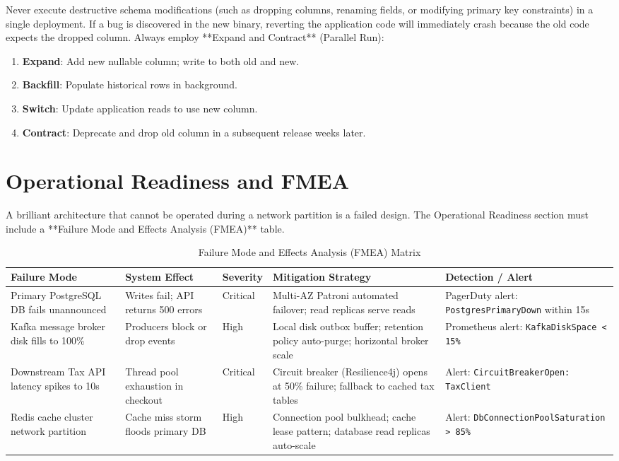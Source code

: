 \begin{productionwarningbox}
Never execute destructive schema modifications (such as dropping columns, renaming fields, or modifying primary key constraints) in a single deployment. If a bug is discovered in the new binary, reverting the application code will immediately crash because the old code expects the dropped column. Always employ **Expand and Contract** (Parallel Run):
\begin{enumerate}
  \item \textbf{Expand}: Add new nullable column; write to both old and new.
  \item \textbf{Backfill}: Populate historical rows in background.
  \item \textbf{Switch}: Update application reads to use new column.
  \item \textbf{Contract}: Deprecate and drop old column in a subsequent release weeks later.
\end{enumerate}
\end{productionwarningbox}

\section{Operational Readiness and FMEA}

A brilliant architecture that cannot be operated during a network partition is a failed design. The Operational Readiness section must include a **Failure Mode and Effects Analysis (FMEA)** table.

\begin{table}[htbp]
\centering\scriptsize
\begin{tabular}{p{2.5cm}p{2.8cm}p{1.2cm}p{2.8cm}p{2.8cm}}
\toprule
\textbf{Failure Mode} & \textbf{System Effect} & \textbf{Severity} & \textbf{Mitigation Strategy} & \textbf{Detection / Alert} \\
\midrule
Primary PostgreSQL DB fails unannounced & Writes fail; API returns 500 errors & Critical & Multi-AZ Patroni automated failover; read replicas serve reads & PagerDuty alert: \texttt{PostgresPrimaryDown} within 15s \\
Kafka message broker disk fills to 100\% & Producers block or drop events & High & Local disk outbox buffer; retention policy auto-purge; horizontal broker scale & Prometheus alert: \texttt{KafkaDiskSpace < 15\%} \\
Downstream Tax API latency spikes to 10s & Thread pool exhaustion in checkout & Critical & Circuit breaker (Resilience4j) opens at 50\% failure; fallback to cached tax tables & Alert: \texttt{CircuitBreakerOpen: TaxClient} \\
Redis cache cluster network partition & Cache miss storm floods primary DB & High & Connection pool bulkhead; cache lease pattern; database read replicas auto-scale & Alert: \texttt{DbConnectionPoolSaturation > 85\%} \\
\bottomrule
\end{tabular}
\caption{Failure Mode and Effects Analysis (FMEA) Matrix}
\label{tab:fmea-matrix}
\end{table}

